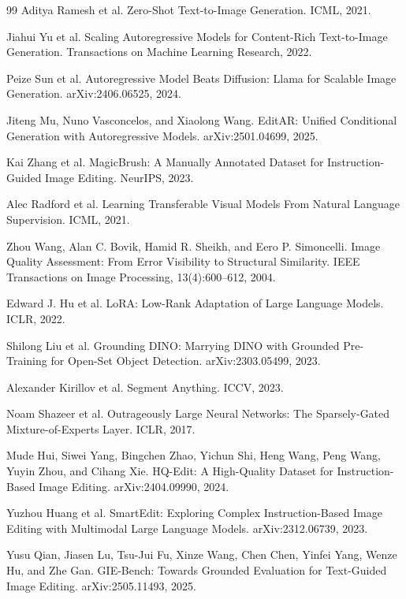 \documentclass[UTF8,11pt,a4paper,fontset=fandol]{ctexart}
\begin{document}
\begin{thebibliography}{99}
Aditya Ramesh et al.
\newblock Zero-Shot Text-to-Image Generation.
\newblock ICML, 2021.

Jiahui Yu et al.
\newblock Scaling Autoregressive Models for Content-Rich Text-to-Image Generation.
\newblock Transactions on Machine Learning Research, 2022.

Peize Sun et al.
\newblock Autoregressive Model Beats Diffusion: Llama for Scalable Image Generation.
\newblock arXiv:2406.06525, 2024.

Jiteng Mu, Nuno Vasconcelos, and Xiaolong Wang.
\newblock EditAR: Unified Conditional Generation with Autoregressive Models.
\newblock arXiv:2501.04699, 2025.

Kai Zhang et al.
\newblock MagicBrush: A Manually Annotated Dataset for Instruction-Guided Image Editing.
\newblock NeurIPS, 2023.

Alec Radford et al.
\newblock Learning Transferable Visual Models From Natural Language Supervision.
\newblock ICML, 2021.

Zhou Wang, Alan C. Bovik, Hamid R. Sheikh, and Eero P. Simoncelli.
\newblock Image Quality Assessment: From Error Visibility to Structural Similarity.
\newblock IEEE Transactions on Image Processing, 13(4):600--612, 2004.

Edward J. Hu et al.
\newblock LoRA: Low-Rank Adaptation of Large Language Models.
\newblock ICLR, 2022.

Shilong Liu et al.
\newblock Grounding DINO: Marrying DINO with Grounded Pre-Training for Open-Set Object Detection.
\newblock arXiv:2303.05499, 2023.

Alexander Kirillov et al.
\newblock Segment Anything.
\newblock ICCV, 2023.

Noam Shazeer et al.
\newblock Outrageously Large Neural Networks: The Sparsely-Gated Mixture-of-Experts Layer.
\newblock ICLR, 2017.

Mude Hui, Siwei Yang, Bingchen Zhao, Yichun Shi, Heng Wang, Peng Wang, Yuyin Zhou, and Cihang Xie.
\newblock HQ-Edit: A High-Quality Dataset for Instruction-Based Image Editing.
\newblock arXiv:2404.09990, 2024.

Yuzhou Huang et al.
\newblock SmartEdit: Exploring Complex Instruction-Based Image Editing with Multimodal Large Language Models.
\newblock arXiv:2312.06739, 2023.

Yusu Qian, Jiasen Lu, Tsu-Jui Fu, Xinze Wang, Chen Chen, Yinfei Yang, Wenze Hu, and Zhe Gan.
\newblock GIE-Bench: Towards Grounded Evaluation for Text-Guided Image Editing.
\newblock arXiv:2505.11493, 2025.

\end{thebibliography}
\end{document}
